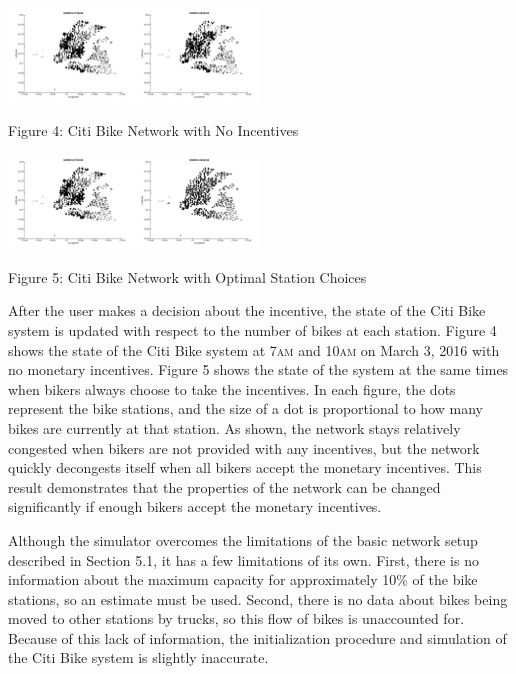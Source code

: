 \documentclass[times, 10pt,twocolumn]{article}
\begin{document}
\hfill \break
\centerline{\includegraphics[width=0.25\textwidth]{m2/no_incentives_before.png}\includegraphics[width=0.25\textwidth]{m2/no_incentives_after.png}}
\centerline{Figure 4: Citi Bike Network with No Incentives}
\hfill \break
\centerline{\includegraphics[width=0.25\textwidth]{m2/incentives_before.png}\includegraphics[width=0.25\textwidth]{m2/incentives_after.png}}
\centerline{Figure 5: Citi Bike Network with Optimal Station Choices}
\hfill \break
\indent After the user makes a decision about the incentive, the state of the Citi Bike system is updated with respect to the number of bikes at each station. Figure 4 shows the state of the Citi Bike system at 7\textsc{am} and 10\textsc{am} on March 3, 2016 with no monetary incentives. Figure 5 shows the state of the system at the same times when bikers always choose to take the incentives. In each figure, the dots represent the bike stations, and the size of a dot is proportional to how many bikes are currently at that station. As shown, the network stays relatively congested when bikers are not provided with any incentives, but the network quickly decongests itself when all bikers accept the monetary incentives. This result demonstrates that the properties of the network can be changed significantly if enough bikers accept the monetary incentives.

Although the simulator overcomes the limitations of the basic network setup described in Section 5.1, it has a few limitations of its own. First, there is no information about the maximum capacity for approximately 10\% of the bike stations, so an estimate must be used. Second, there is no data about bikes being moved to other stations by trucks, so this flow of bikes is unaccounted for. Because of this lack of information, the initialization procedure and simulation of the Citi Bike system is slightly inaccurate.
\end{document}
